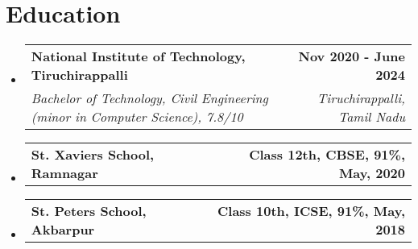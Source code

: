 \documentclass[letterpaper,11pt]{article}
\makeatletter
\newcommand{\resumeSubheading}[4]{
  \vspace{-2pt}\item
    \begin{tabular*}{1.0\textwidth}[t]{l@{\extracolsep{\fill}}r}
      \textbf{#1} & \textbf{\small #2} \\
      \textit{\small#3} & \textit{\small #4} \\
    \end{tabular*}\vspace{-8pt}
}
\newcommand{\eduSubheading}[2]{
  \vspace{-2pt}\item
    \begin{tabular*}{1.0\textwidth}[t]{l@{\extracolsep{\fill}}r}
      \textbf{#1} & \textbf{\small #2} \\
    \end{tabular*}\vspace{-8pt}
}
\newcommand{\resumeSubHeadingListStart}{\begin{itemize}[leftmargin=0.0in, label={}]}
\newcommand{\resumeSubHeadingListEnd}{\end{itemize}}
\makeatother
\begin{document}
\section{Education}
  \resumeSubHeadingListStart
    \resumeSubheading
      {National Institute of Technology, Tiruchirappalli}{Nov 2020 - June 2024}
      {Bachelor of Technology, Civil Engineering (minor in Computer Science), 7.8/10}{Tiruchirappalli, Tamil Nadu}
  \resumeSubHeadingListEnd
  \resumeSubHeadingListStart
    \eduSubheading
      {St. Xavier\textquotesingle{}s School, Ramnagar}{Class 12th, CBSE, 91\%, May, 2020}
  \resumeSubHeadingListEnd
  \resumeSubHeadingListStart
    \eduSubheading
      {St. Peter\textquotesingle{}s School, Akbarpur}{Class 10th, ICSE, 91\%, May, 2018}
  \resumeSubHeadingListEnd
\end{document}
